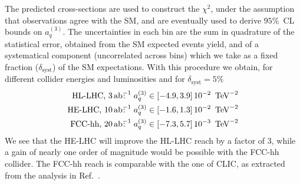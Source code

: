 The predicted cross-sections are used to construct the $\chi^2$, under the assumption that observations  agree with the SM, and are eventually used to derive $95\%$~CL bounds on $a_q^{(3)}$. The uncertainties in each bin are the sum in quadrature of the statistical error, obtained from the SM expected events yield, and of a systematical component (uncorrelated across bins) which we take as a fixed fraction ($\delta_{\textrm{syst}}$) of the SM expectations. With this procedure we obtain, for different collider energies and luminosities and for $\delta_{\textrm{syst}}=5\%$
\begin{eqnarray}
{\textrm{HL-LHC, }} 3\,{\textrm{ab}}^{-1}\hspace{-10pt} & {\textrm{:}} & a^{(3)}_q  \in  [-4.9, 3.9] \,10^{-2}\,\UTeV^{-2}\nonumber\\
{\textrm{HE-LHC, }} 10\,{\textrm{ab}}^{-1}\hspace{-10pt} & {\textrm{:}} & a^{(3)}_q  \in  [-1.6, 1.3] \,10^{-2}\,\UTeV^{-2}\nonumber\\
{\textrm{FCC-hh, }} 20\,{\textrm{ab}}^{-1}\hspace{-10pt} & {\textrm{:}} & a^{(3)}_q  \in  [-7.3, 5.7] \,10^{-3}\,\UTeV^{-2}
\label{boundsf}
\end{eqnarray}
We see that the HE-LHC will improve the HL-LHC reach by a factor of $3$, while a gain of nearly one order of magnitude would be possible with the FCC-hh collider. The FCC-hh reach is comparable with the one of CLIC, as extracted from the analysis in Ref.~\cite{Ellis:2017kfi}.
 
 
